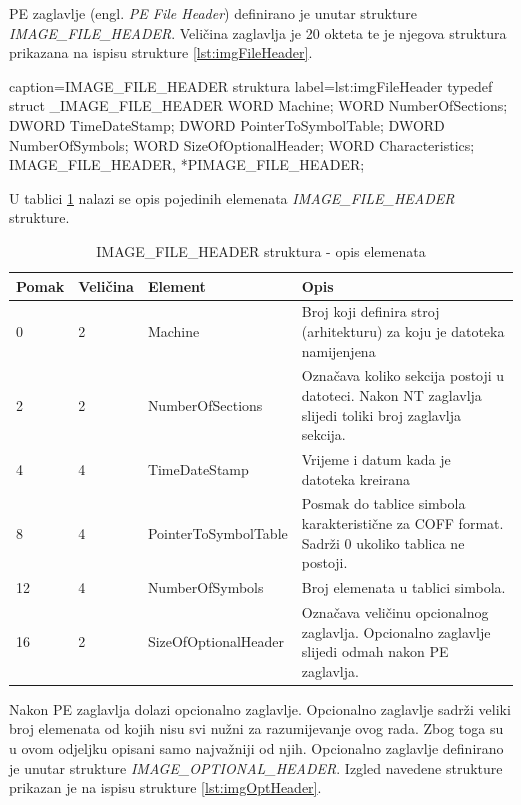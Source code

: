 \documentclass[times, utf8, diplomski, numeric]{fer}
\begin{document}
PE zaglavlje (engl. \emph{PE File Header}) definirano je unutar
strukture \emph{IMAGE\_FILE\_HEADER}. Veličina zaglavlja je 20
okteta te je njegova struktura prikazana na ispisu strukture \ref{lst:imgFileHeader}.

\begin{struktura} {caption=IMAGE\_FILE\_HEADER struktura} {label=lst:imgFileHeader}
typedef struct _IMAGE_FILE_HEADER {
	WORD    Machine;
	WORD    NumberOfSections;
	DWORD   TimeDateStamp;
	DWORD   PointerToSymbolTable;
	DWORD   NumberOfSymbols;
	WORD    SizeOfOptionalHeader;
	WORD    Characteristics;
} IMAGE_FILE_HEADER, *PIMAGE_FILE_HEADER;
\end{struktura}

U tablici \ref{tbl:imgFileHdr} nalazi se opis pojedinih elemenata
\emph{IMAGE\_FILE\_HEADER} strukture.

\pagebreak  %

\begin{table}[htb]
\small
\caption{IMAGE\_FILE\_HEADER struktura - opis elemenata}
\label{tbl:imgFileHdr}
\centering
\begin{tabular}{|l|l|l|p{6cm}|}
\hline
Pomak & Veličina & Element & Opis \\ \hline
0 & 2 & Machine & Broj koji definira stroj (arhitekturu) za koju je datoteka namijenjena \\ \hline
2 & 2 & NumberOfSections & Označava koliko sekcija postoji u datoteci. Nakon NT zaglavlja slijedi toliki broj zaglavlja sekcija. \\ \hline
4 & 4 & TimeDateStamp & Vrijeme i datum kada je datoteka kreirana \\ \hline
8 & 4 & PointerToSymbolTable & Posmak do tablice simbola karakteristične za COFF format. Sadrži 0 ukoliko tablica ne postoji. \\ \hline
12 & 4 & NumberOfSymbols & Broj elemenata u tablici simbola. \\ \hline
16 & 2 & SizeOfOptionalHeader & Označava veličinu opcionalnog zaglavlja. Opcionalno zaglavlje slijedi odmah nakon PE zaglavlja. \\ \hline
\end{tabular}
\end{table}

Nakon PE zaglavlja dolazi opcionalno zaglavlje. Opcionalno
zaglavlje sadrži veliki broj elemenata od kojih nisu svi nužni za
razumijevanje ovog rada. Zbog toga su u ovom odjeljku opisani
samo najvažniji od njih. Opcionalno zaglavlje definirano je
unutar strukture \emph{IMAGE\_OPTIONAL\_HEADER}. Izgled navedene
strukture prikazan je na ispisu strukture \ref{lst:imgOptHeader}.
\end{document}
